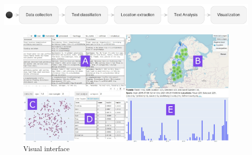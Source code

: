 \documentclass{beamer}
\begin{document}
\begin{frame}

  \includegraphics[scale=0.4]{./images/p4.png}
  \begin{figure}
    \includegraphics[width=\textwidth]{../report/images/visual_interface.png}
    \caption{Visual interface}
  \end{figure}
\end{frame}



\end{document}
